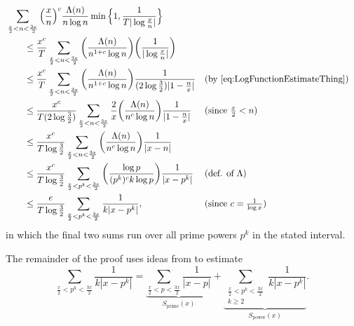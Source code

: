 \documentclass[10pt,reqno]{amsart}
\theoremstyle{plain}
\theoremstyle{definition}
\begin{document}
\begin{align}
& \sum_{\frac{x}{2} < n < \frac{3x}{2}}  \Big( \frac{x}{n}\Big)^c  \frac{ \Lambda(n) }{n \log n}
\min\Big\{ 1 , \frac{1}{T | \log \frac{x}{n} |} \Big\}  \nonumber \\
&\qquad\leq  \frac{x^c}{T}  \sum_{ \frac{x}{2} < n < \frac{3x}{2}}   \bigg( \frac{ \Lambda(n) }{n^{1+c} \log n}\bigg)
\bigg( \frac{1}{ | \log \frac{x}{n} |} \bigg) \nonumber \\
&\qquad\leq  \frac{x^c}{T} \sum_{\frac{x}{2} < n < \frac{3x}{2}} \bigg( \frac{ \Lambda(n) }{n^{1+c} \log n}\bigg)  \frac{1}{ (2\log \frac{3}{2}) | 1 - \frac{n}{x} |} 
&& (\text{by \eqref{eq:LogFunctionEstimateThing}}) \nonumber \\
&\qquad\leq \frac{ x^c}{T (2\log\frac{3}{2}) } \sum_{\frac{x}{2} < n < \frac{3x}{2}}  \frac{2}{x} \bigg( \frac{ \Lambda(n) }{n^c \log n}\bigg)\frac{1}{ |  1 - \frac{n}{x} |} 
&& (\text{since $\tfrac{x}{2} < n$}) \nonumber \\
&\qquad\leq \frac{x^c }{T \log \frac{3}{2}} \sum_{\frac{x}{2} < n < \frac{3x}{2}}  \bigg( \frac{ \Lambda(n) }{n^c \log n}\bigg)\frac{1}{ |  x-n |} 
\nonumber \\
&\qquad\leq \frac{x^c }{T \log\frac{3}{2}} \sum_{\frac{x}{2} < p^k < \frac{3 x}{2}}  \bigg( \frac{ \log p }{(p^k)^c k\log p}\bigg)\frac{1}{ |  x-p^k |} && (\text{def. of $\Lambda$})\nonumber \\
&\qquad\leq  \frac{e }{T \log\frac{3}{2}} \sum_{\frac{x}{2} < p^k < \frac{3x}{2}}  \frac{1}{k |  x-p^k |}, 
&&(\text{since $c=\tfrac{1}{\log x}$})
\label{eq:FirstPP}
\end{align}
in which the final two sums run over all prime powers $p^k$ in the stated interval.  

The remainder of the proof uses ideas from \cite[Lem.~2]{Goldston83} to estimate
\begin{equation}\label{eq:Trouble}
\sum_{\frac{x}{2} < p^k < \frac{3x}{2}}  \frac{1}{ k | x-p^k |}
= \underbrace{\sum_{\frac{x}{2} < p < \frac{3x}{2}}  \frac{1}{ | x-p |} }_{S_{\mathrm{prime}}(x)}
+ \underbrace{ \sum_{ \substack{\frac{x}{2} < p^k < \frac{3x}{2}\\ k\geq 2}}  \frac{1}{ k | x-p^k |} }_{S_{\mathrm{power}}(x)} .
\end{equation}

\end{document}
